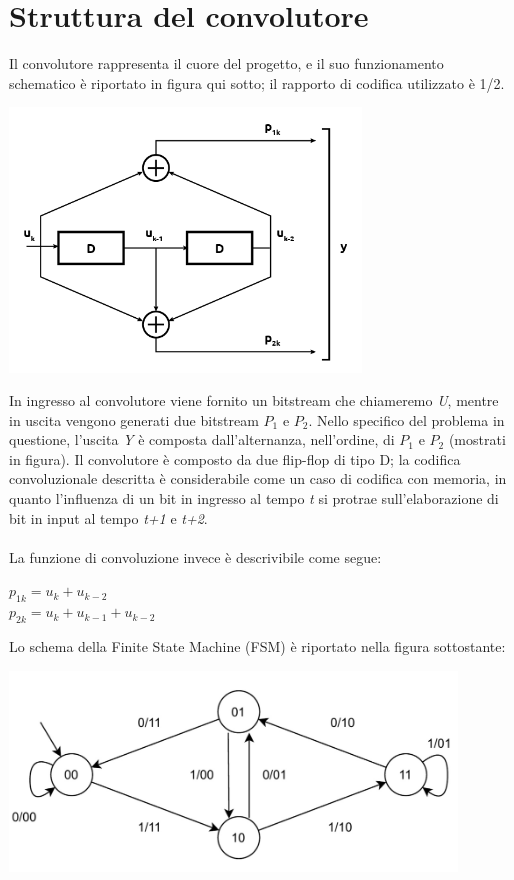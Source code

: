 \section{Struttura del convolutore}
Il convolutore rappresenta il cuore del progetto, e il suo funzionamento schematico è riportato in figura qui sotto; il rapporto di codifica utilizzato è 1/2.
\begin{center}
\includegraphics[width=0.7\textwidth]{images/Convolutore.png}
\end{center}

In ingresso al convolutore viene fornito un bitstream che chiameremo \textit{U}, mentre in uscita vengono generati due bitstream \textit{$P_1$} e \textit{$P_2$}. Nello specifico del problema in questione, l’uscita \textit{Y} è composta dall’alternanza, nell’ordine, di \textit{$P_1$} e \textit{$P_2$} (mostrati in figura). Il convolutore è composto da due flip-flop di tipo D; la codifica convoluzionale descritta è considerabile come un caso di codifica con memoria, in quanto l’influenza di un bit in ingresso al tempo \textit{t} si protrae sull’elaborazione di bit in input al tempo \textit{t+1} e \textit{t+2}.
\\\\
La funzione di convoluzione invece è descrivibile come segue:
\begin{center}
    $p_{1k}=u_k+u_{k-2}$
    \\
    $p_{2k}=u_k+u_{k-1}+u_{k-2}$
\end{center}
Lo schema della Finite State Machine (FSM) è riportato nella figura sottostante:

\begin{center}
\includegraphics[width=0.89\textwidth]{images/FSM Conv.jpg}
\end{center}

